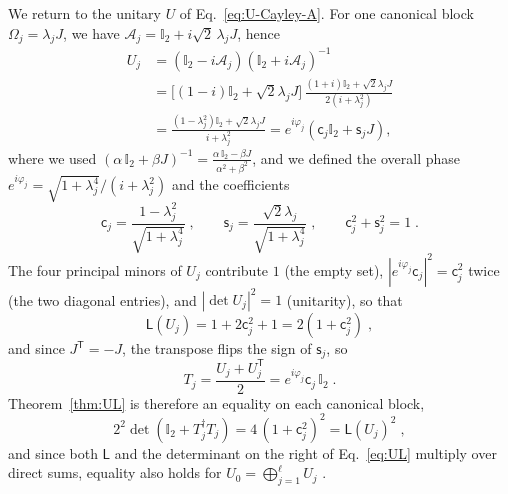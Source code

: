 \documentclass[prx,twocolumn,superscriptaddress,aps,10pt, frontmatterverbose, reprint,footinbib,longbibliography=true]{revtex4-2}
\newcommand{\trans}{\mathsf{T}}
\begin{document}
We return to the unitary $U$ of Eq.~\eqref{eq:U-Cayley-A}. For one canonical block $\Omega_j=\lambda_jJ$, we have $\mathcal{A}_j=\mathbb{I}_2+i\sqrt2\,\lambda_jJ$, hence
\begin{equation}
\begin{split}
    U_j&=(\mathbb{I}_2-i\mathcal{A}_j)(\mathbb{I}_2+i\mathcal{A}_j)^{-1}\\
    &=\big[(1-i)\mathbb{I}_2+\sqrt2\lambda_jJ\big]\,\frac{(1+i)\mathbb{I}_2+\sqrt2\lambda_jJ}{2(i+\lambda_j^2)}\\
    &=\frac{(1-\lambda_j^2)\mathbb{I}_2+\sqrt2\lambda_jJ}{i+\lambda_j^2}=e^{i\varphi_j}\left(\mathsf{c}_j\mathbb{I}_2+\mathsf{s}_jJ\right),
\end{split}
\end{equation} 
where we used $(\alpha\,\mathbb{I}_2+\beta J)^{-1}=\frac{\alpha\,\mathbb{I}_2-\beta J}{\alpha^2+\beta^2}$, and we defined the overall phase $e^{i\varphi_j}=\sqrt{1+\lambda_j^4}/(i+\lambda_j^2)$ and the coefficients
\begin{equation}
    \mathsf{c}_j=\frac{1-\lambda_j^2}{\sqrt{1+\lambda_j^4}}\;,\qquad \mathsf{s}_j=\frac{\sqrt2\lambda_j}{\sqrt{1+\lambda_j^4}}\;,\qquad \mathsf{c}_j^2+\mathsf{s}_j^2=1\;.
\end{equation}
The four principal minors of $U_j$ contribute $1$ (the empty set), $|e^{i\varphi_j}\mathsf{c}_j|^2=\mathsf{c}_j^2$ twice (the two diagonal entries), and $|\det U_j|^2=1$ (unitarity), so that
\begin{equation}
    \mathsf{L}(U_j)=1+2\mathsf{c}_j^2+1=2(1+\mathsf{c}_j^2)\;,
\end{equation}
and since $J^{\trans}=-J$, the transpose flips the sign of $\mathsf{s}_j$, so
\begin{equation}
    T_j=\frac{U_j+U_j^{\trans}}{2}=e^{i\varphi_j}\mathsf{c}_j\,\mathbb{I}_2\;.
\end{equation}
Theorem~\ref{thm:UL} is therefore an equality on each canonical block,
\begin{equation}
    2^2\det(\mathbb{I}_2+T_j^\dagger T_j)=4\,(1+\mathsf{c}_j^2)^2=\mathsf{L}(U_j)^2\;,
\end{equation}
and since both $\mathsf{L}$ and the determinant on the right of Eq.~\eqref{eq:UL} multiply over direct sums, equality also holds for $U_0=\bigoplus_{j=1}^{\ell}U_j$ .
\end{document}
